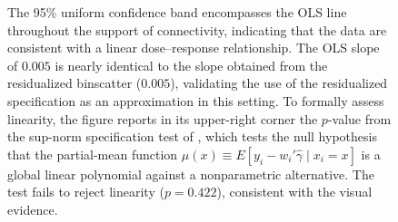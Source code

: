 \begin{figure}[H]
\begin{minipage}{0.75\textwidth}
    The 95\% uniform confidence band encompasses the OLS line throughout the support of connectivity, indicating that the data are consistent with a linear dose--response relationship. The OLS slope of $0.005$ is nearly identical to the slope obtained from the residualized binscatter ($0.005$), validating the use of the residualized specification as an approximation in this setting. To formally assess linearity, the figure reports in its upper-right corner the $p$-value from the sup-norm specification test of \citet{Cattaneo2024}, which tests the null hypothesis that the partial-mean function $\mu(x) \equiv E[y_i - w_i'\hat{\gamma} \mid x_i = x]$ is a global linear polynomial against a nonparametric alternative. The test fails to reject linearity ($p = 0.422$), consistent with the visual evidence.
\end{minipage}
\end{figure}
